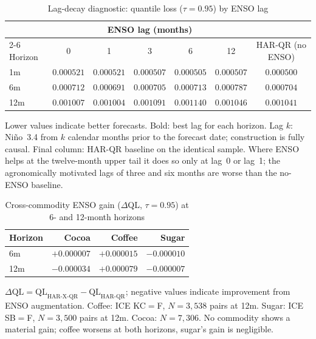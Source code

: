 









\begin{table}[htbp]
\centering
\small
\caption{Lag-decay diagnostic: quantile loss ($\tau = 0.95$) by ENSO lag}
\label{tab:lag-decay}
\begin{tabular}{lcccccc}
\toprule
 & \multicolumn{5}{c}{ENSO lag (months)} & \\
\cmidrule(lr){2-6}
Horizon & 0 & 1 & 3 & 6 & 12 & HAR-QR (no ENSO) \\
\midrule
1m  & $0.000521$ & $0.000521$ & $0.000507$ & $\mathbf{0.000505}$ & $0.000507$ & $0.000500$ \\
6m  & $0.000712$ & $\mathbf{0.000691}$ & $0.000705$ & $0.000713$ & $0.000787$ & $0.000704$ \\
12m & $0.001007$ & $\mathbf{0.001004}$ & $0.001091$ & $0.001140$ & $0.001046$ & $0.001041$ \\
\bottomrule
\end{tabular}
\par\smallskip
{\footnotesize Lower values indicate better forecasts. Bold: best lag for each horizon. Lag $k$: Ni\~no~3.4 from $k$ calendar months prior to the forecast date; construction is fully causal. Final column: HAR-QR baseline on the identical sample. Where ENSO helps at the twelve-month upper tail it does so only at lag~0 or lag~1; the agronomically motivated lags of three and six months are worse than the no-ENSO baseline.}
\end{table}

\begin{table}[htbp]
\centering
\small
\caption{Cross-commodity ENSO gain ($\Delta$QL, $\tau = 0.95$) at 6- and
12-month horizons}
\label{tab:cross-commodity}
\begin{tabular}{lrrr}
\toprule
Horizon & Cocoa & Coffee & Sugar \\
\midrule
6m  & $+0.000007$ & $+0.000015$ & $-0.000010$ \\
12m & $-0.000034$ & $+0.000079$ & $-0.000007$ \\
\bottomrule
\end{tabular}
\par\smallskip
{\footnotesize $\Delta\text{QL} = \text{QL}_{\text{HAR-X-QR}} - \text{QL}_{\text{HAR-QR}}$; negative values indicate improvement from ENSO augmentation. Coffee: ICE KC$=$F, $N = 3{,}538$ pairs at 12m. Sugar: ICE SB$=$F, $N = 3{,}500$ pairs at 12m. Cocoa: $N = 7{,}306$. No commodity shows a material gain; coffee worsens at both horizons, sugar's gain is negligible.}
\end{table}
